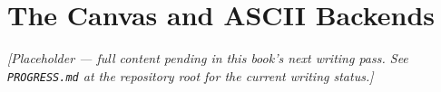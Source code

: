 \chapter{The Canvas and ASCII Backends}
\label{ch:canvas-ascii-backends}

\emph{[Placeholder --- full content pending in this book's next writing pass. See \texttt{PROGRESS.md} at the repository root for the current writing status.]}

